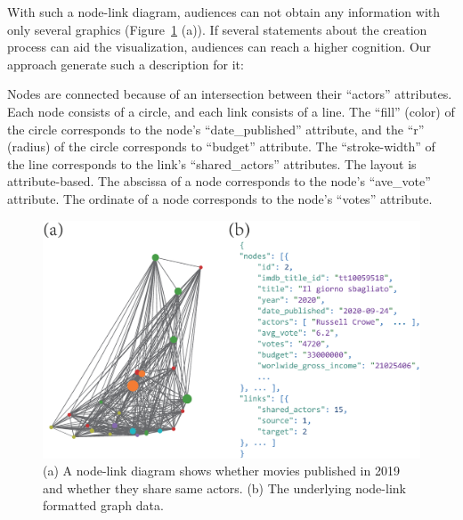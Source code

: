 With such a node-link diagram, audiences can not obtain any information with only several graphics (Figure~\ref{fig:IMDbDiagram} (a)).
If several statements about the creation process can aid the visualization, audiences can reach a higher cognition.
Our approach generate such a description for it:
\begin{lightgrayleftbar}\noindent
    Nodes are connected because of an intersection between their ``actors'' attributes.
    Each node consists of a circle, and each link consists of a line.
    The ``fill'' (color) of the circle corresponds to the node's ``date\_published'' attribute, and the ``r'' (radius) of the circle corresponds to ``budget'' attribute.
    The ``stroke-width'' of the line corresponds to the link's ``shared\_actors'' attributes.
    The layout is attribute-based.
    The abscissa of a node corresponds to the node's ``ave\_vote'' attribute.
    The ordinate of a node corresponds to the node's ``votes'' attribute.
\end{lightgrayleftbar}

\begin{figure}
    \centering
    \includegraphics[width=1\columnwidth]{firgures/IMDbDiagram}
    \caption{ (a) A node-link diagram shows whether movies published in 2019 and whether they share same actors. (b) The underlying node-link formatted graph data.}
    \label{fig:IMDbDiagram}
\end{figure}


